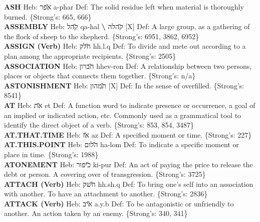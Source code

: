 {\textbf{ASH} Heb: {\large\H אפר} a-phar Def: The solid residue left when material is thoroughly burned. \{Strong's: 665, 666\}\hfill{}\\

\textbf{ASSEMBLY} Heb: {\large\H קהל} qa-hal \textbf{\textbackslash{}} {\large\H קהלה} {[}X{]} Def: A large group, as a gathering of the flock of sheep to the shepherd. \{Strong's: 6951, 3862, 6952\}\hfill{}\\

\textbf{ASSIGN (Verb)} Heb: {\large\H חלק} hh.l.q Def: To divide and mete out according to a plan among the appropriate recipients. \{Strong's: 2505\}\hfill{}\\

\textbf{ASSOCIATION} Heb: {\large\H חברון} hhev-ron Def: A relationship between two persons, places or objects that connects them together. \{Strong's: n/a\}\hfill{}\\

\textbf{ASTONISHMENT} Heb: {\large\H תמהון} {[}X{]} Def: In the sense of overfilled. \{Strong's: 8541\}\hfill{}\\

\textbf{AT} Heb: {\large\H את} et Def: A function word to indicate presence or occurrence, a goal of an implied or indicated action, etc. Commonly used as a grammatical tool to identify the direct object of a verb. \{Strong's: 853, 854, 3487\}\hfill{}\\

\textbf{AT.THAT.TIME} Heb: {\large\H אז} az Def: A specified moment or time. \{Strong's: 227\}\hfill{}\\

\textbf{AT.THIS.POINT} Heb: {\large\H הלום} ha-lom Def: To indicate a specific moment or place in time. \{Strong's: 1988\}\hfill{}\\

\textbf{ATONEMENT} Heb: {\large\H כיפור} ki-pur Def: An act of paying the price to release the debt or person. A covering over of transgression. \{Strong's: 3725\}\hfill{}\\

\textbf{ATTACH (Verb)} Heb: {\large\H חשק} hh.sh.q Def: To bring one's self into an association with another. To have an attachment to another. \{Strong's: 2836\}\hfill{}\\

\textbf{ATTACK (Verb)} Heb: {\large\H איב} a.y.b Def: To be antagonistic or unfriendly to another. An action taken by an enemy. \{Strong's: 340, 341\}\hfill{}\\

}
